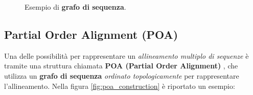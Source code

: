     \vspace{10pt}
    \begin{figure}[h]
        \centering
        \caption{Esempio di \textbf{grafo di sequenza}.}
    \end{figure}

\subsection{Partial Order Alignment (POA)}
    Una delle possibilità per rappresentare un \emph{allineamento multiplo di sequenze} è tramite una struttura chiamata \textbf{POA (Partial Order Alignment)} \cite{POA}, che utilizza un \textbf{grafo di sequenza} \emph{ordinato topologicamente} per rappresentare l'allineamento. Nella figura \ref{fig:poa_construction} è riportato un esempio:
    \clearpage

